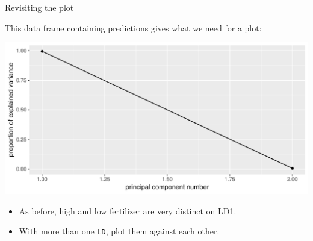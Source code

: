 \begin{frame}[fragile]{Revisiting the plot}
  
This data frame containing predictions gives what we need for a plot:

\begin{knitrout}
\color{fgcolor}\begin{kframe}
\begin{alltt}
\hlstd{(}\hlopt{+}\hlstd{()}
\end{alltt}
\end{kframe}
\includegraphics[width=\maxwidth]{figure/unnamed-chunk-7-1} 

\end{knitrout}

\begin{itemize}
\item As before, high and low fertilizer are very distinct on LD1.
\item With more than one \texttt{LD}, plot them against each other.
\end{itemize}
  
\end{frame}



